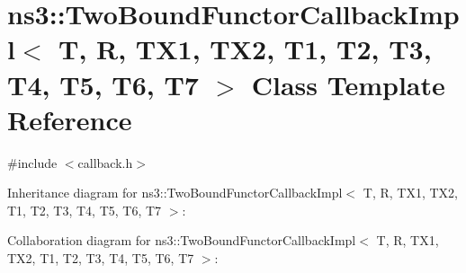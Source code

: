\hypertarget{classns3_1_1TwoBoundFunctorCallbackImpl}{}\section{ns3\+:\+:Two\+Bound\+Functor\+Callback\+Impl$<$ T, R, T\+X1, T\+X2, T1, T2, T3, T4, T5, T6, T7 $>$ Class Template Reference}
\label{classns3_1_1TwoBoundFunctorCallbackImpl}


{\ttfamily \#include $<$callback.\+h$>$}



Inheritance diagram for ns3\+:\+:Two\+Bound\+Functor\+Callback\+Impl$<$ T, R, T\+X1, T\+X2, T1, T2, T3, T4, T5, T6, T7 $>$\+:


Collaboration diagram for ns3\+:\+:Two\+Bound\+Functor\+Callback\+Impl$<$ T, R, T\+X1, T\+X2, T1, T2, T3, T4, T5, T6, T7 $>$\+:
